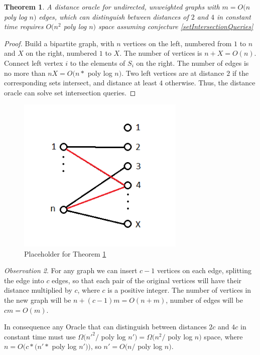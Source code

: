 \documentclass[shortabstract, lic, english]{iithesis}
\theoremstyle{definition} \newtheorem{definition}{Definition}[chapter]
\theoremstyle{remark} \newtheorem{remark}[definition]{Observation}
\theoremstyle{plain} \newtheorem{theorem}[definition]{Theorem}
\theoremstyle{plain} \newtheorem{lemma}[definition]{Lemma}
\theoremstyle{plain} \newtheorem{conjecture}[definition]{Conjecture}
\begin{document}
\begin{theorem} \label{alphaAbove2} \cite{21OracleLessMemory}
    A distance oracle for undirected, unweighted graphs with $m = O(n $ poly log $ n)$ edges, which can distinguish between distances of $2$ and $4$ in constant time
    requires $O(n^2 $ poly log $ n)$ space assuming conjecture \ref{setIntersectionQueries}
\end{theorem}

\begin{proof}
    Build a bipartite graph, with $n$ vertices on the left, numbered from $1$ to $n$ and $X$ on the right, numbered $1$ to $X$. The number of vertices
    is $n + X = O(n)$. Connect left vertex $i$ to the elements of $S_i$ on the right. The number of edges is no more than $nX = O(n * $ poly log $n)$.
    Two left vertices are at distance $2$ if the corresponding sets intersect, and distance at least $4$ otherwise.
    Thus, the distance oracle can solve set intersection queries.
\end{proof}

\begin{figure}[h]
    \includegraphics[width=8cm]{images/placeholder_setintersection}
    \centering
    \caption{Placeholder for Theorem \ref{alphaAbove2}}
\end{figure}

\begin{remark}
    For any graph we can insert $c-1$ vertices on each edge, splitting the edge into $c$ edges,
    so that each pair of the original vertices will have their distance multiplied by $c$, where $c$ is a positive integer.
    The number of vertices in the new graph will be $n + (c-1)m = O(n + m)$, number of edges will be $cm = O(m)$.
\end{remark}

In consequence any Oracle that can distinguish between distances $2c$ and $4c$ in constant time must use $\Omega(n'^2 /$ poly log $ n') = \Omega(n^2 /$ poly log $ n)$ space,
where $n = O(c * (n' * $ poly log $n'))$, so $n' = O(n/$ poly log $n)$.
\end{document}
